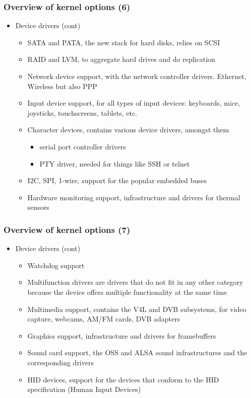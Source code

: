 \begin{frame}
  \frametitle{Overview of kernel options (6)}
  \begin{itemize}
  \item Device drivers (cont)
    \begin{itemize}
    \item SATA and PATA, the new stack for hard disks, relies on SCSI
    \item RAID and LVM, to aggregate hard drives and do replication
    \item Network device support, with the network controller
      drivers. Ethernet, Wireless but also PPP
    \item Input device support, for all types of input devices:
      keyboards, mice, joysticks, touchscreens, tablets, etc.
    \item Character devices, contains various device drivers, amongst
      them
      \begin{itemize}
      \item serial port controller drivers
      \item PTY driver, needed for things like SSH or telnet
      \end{itemize}
    \item I2C, SPI, 1-wire, support for the popular embedded buses
    \item Hardware monitoring support, infrastructure and drivers for
      thermal sensors
    \end{itemize}
  \end{itemize}
\end{frame}

\begin{frame}
  \frametitle{Overview of kernel options (7)}
  \begin{itemize}
  \item Device drivers (cont)
    \begin{itemize}
    \item Watchdog support
    \item Multifunction drivers are drivers that do not fit in any
      other category because the device offers multiple functionality
      at the same time
    \item Multimedia support, contains the V4L and DVB subsystems, for
      video capture, webcams, AM/FM cards, DVB adapters
    \item Graphics support, infrastructure and drivers for
      framebuffers
    \item Sound card support, the OSS and ALSA sound infrastructures
      and the corresponding drivers
    \item HID devices, support for the devices that conform to the HID
      specification (Human Input Devices)
    \end{itemize}
  \end{itemize}
\end{frame}

